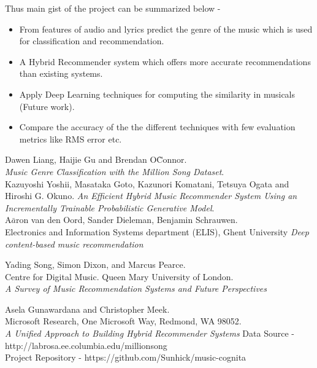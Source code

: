 \documentclass{sig-alternate-05-2015}
\begin{document}
Thus main gist of the project can be summarized below -\\

\begin{itemize}
    \item From features of audio and lyrics predict the genre of the music which is used for classification and recommendation.
    \item A Hybrid Recommender system which offers more accurate recommendations than existing systems.
    \item Apply Deep Learning techniques for computing the similarity in musicals (Future work).
    \item Compare the accuracy of the the different techniques with few evaluation metrics like RMS error etc.
\end{itemize}

\begin{thebibliography}{}
Dawen Liang, Haijie Gu and Brendan O\`Connor.\\
\textit{Music Genre Classification with the Million Song Dataset}. \\
 
Kazuyoshi Yoshii, Masataka Goto, Kazunori Komatani, Tetsuya Ogata and Hiroshi G. Okuno.
\textit{An Efficient Hybrid Music Recommender System Using an Incrementally Trainable Probabilistic Generative Model}. \\

A$\bar{a}$ron van den Oord, Sander Dieleman, Benjamin Schrauwen. \\
Electronics and Information Systems department (ELIS), Ghent University
\textit{Deep content-based music recommendation}

Yading Song, Simon Dixon, and Marcus Pearce.\\
Centre for Digital Music. Queen Mary University of London.\\
\textit{A Survey of Music Recommendation Systems and Future Perspectives}

Asela Gunawardana and Christopher Meek.\\
Microsoft Research, One Microsoft Way, Redmond, WA 98052.\\
\textit{A Unified Approach to Building Hybrid Recommender Systems}
Data Source - http://labrosa.ee.columbia.edu/millionsong\\

Project Repository - https://github.com/Sunhick/music-cognita\\
\end{thebibliography}



\end{document}
